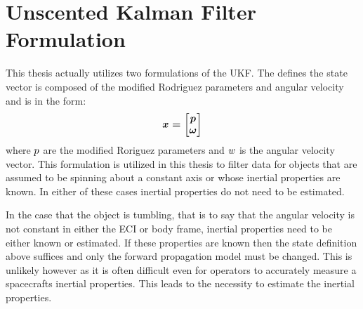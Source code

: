 \chapter*{Unscented Kalman Filter Formulation}

This thesis actually utilizes two formulations of the UKF. The defines the state vector is composed of the modified Rodriguez parameters and angular velocity and is in the form:
\begin{equation}
\boldmath{x = \begin{bmatrix} p \\ \omega \end{bmatrix}}
\end{equation}
where $\boldmath{p}$ are the modified Roriguez parameters and  $\boldmath{w}$ is the angular velocity vector. This formulation is utilized in this thesis to filter data for objects that are assumed to be spinning about a constant axis or whose inertial properties are known. In either of these cases inertial properties do not need to be estimated.

In the case that the object is tumbling, that is to say that the angular velocity is not constant in either the ECI or body frame, inertial properties need to be either known or estimated. If these properties are known then the state definition above suffices and only the forward propagation model must be changed. This is unlikely however as it is often difficult even for operators to accurately measure a spacecrafts inertial properties. This leads to the necessity to estimate the inertial properties.

